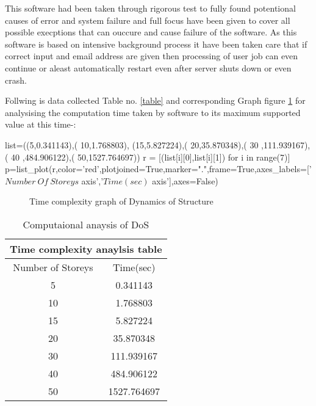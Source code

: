 This software had been taken through rigorous test to fully found potentional causes of error and system failure
and full focus have been given to cover all possible execptions that can 
ouccure and cause failure of the software.
As this software is based on intensive background process it have been taken care that 
if correct input and email address are given then processing of user job can even continue or aleast automatically 
restart even after server shuts down or even crash.

Follwing is data collected Table no. \ref{table} and corresponding Graph figure \ref{fig:graph} for analysising the computation time taken by software 
to its maximum supported value at this time-:
\begin{sagesilent}
list=((5,0.341143),(
10,1.768803),
(15,5.827224),(
20,35.870348),(
30 ,111.939167),(
40 ,484.906122),(
50,1527.764697))
r = [(list[i][0],list[i][1]) for i in range(7)]
p=list_plot(r,color='red',plotjoined=True,marker=".",frame=True,axes_labels=['$Number \ Of \ Storeys$ axis','$Time(sec)$ axis'],axes=False)
\end{sagesilent}

\begin{figure}[H]
	\caption{Time complexity graph of Dynamics of Structure}
	\label{fig:graph}
\end{figure}



\begin{table}[h]
\centering
\begin{tabular}{ ||c|c|| }
\hline
 \multicolumn{2}{||c||}{Time complexity anaylsis table} \\
 \hline
 Number of Storeys & Time(sec) \\ [0.5ex] 
 \hline \hline
	5 & 0.341143 \\ \hline
	10 & 1.768803 \\ \hline
	15 & 5.827224 \\ \hline
	20 & 35.870348 \\ \hline
	30 & 111.939167 \\ \hline
	40 & 484.906122 \\ \hline
	50 & 1527.764697 \\ [1ex]
 \hline
\end{tabular}
\caption{Computaional anaysis of DoS}
\label{table2}
\end{table}

